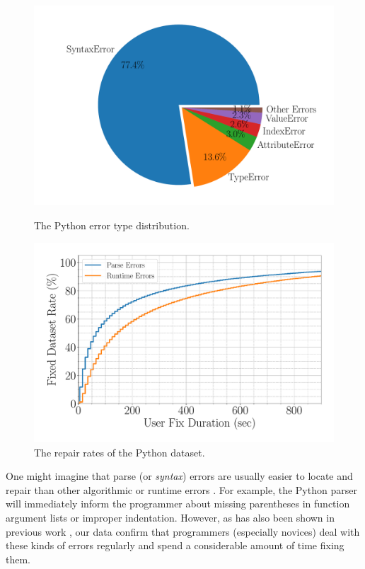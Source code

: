 \begin{figure}[t]
  \centering
  \begin{minipage}[c]{0.50\linewidth}
    \centering
    \includegraphics[width=\linewidth]{error-pie.pdf}
    \caption{The Python error type distribution.}
    \label{fig:error-statistics}
  \end{minipage}
  \begin{minipage}[c]{0.49\linewidth}
      \centering
      \includegraphics[width=\linewidth]{fixed-rate.pdf}
      \caption{The repair rates of the Python dataset.}
      \label{fig:repair-rate}
  \end{minipage}
\end{figure}

One might imagine that parse (or \emph{syntax}) errors are
usually easier to locate and repair than other algorithmic
or runtime errors \citep{Denny_2012}.
%
For example, the Python parser will immediately inform the programmer
about missing parentheses in function argument lists or improper
indentation.
%
However, as has also been shown in previous work \citep{Ahadi_2018,
Kummerfeld2003}, our data confirm that programmers (especially novices) deal
with these kinds of errors regularly and spend a considerable amount of time
fixing them.

